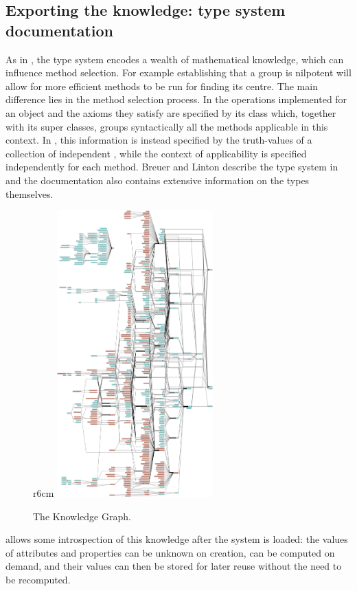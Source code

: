 \subsection{Exporting the \GAP knowledge: type system documentation}
\label{sec:gaptypes}

As in \Sage, the \GAP type system encodes a wealth of mathematical
knowledge, which can influence method selection. For example
establishing that a group is nilpotent will allow for more efficient
methods to be run for finding its centre. The main difference lies in
the method selection process. In \Sage the operations
implemented for an object and the axioms they satisfy are specified by
its class which, together with its super classes, groups syntactically
all the methods applicable in this context. In \GAP, this information
is instead specified by the truth-values of a collection of
independent , while the context of applicability is
specified independently for each method.
%
Breuer and Linton describe the \GAP type system in \cite{breuer-linton} and
the \GAP documentation \cite{GAP4} also contains extensive information on the types
themselves.

\begin{figure}r{6cm}\vspace*{-2em}
  \includegraphics[width=6cm]{gap-graph}\vspace*{-.5em}
  \caption{The \GAP Knowledge Graph.\label{fig:gap-graph}}\vspace*{-2em}
\end{figure}
\GAP allows some introspection of this knowledge after the system is loaded: the values of
attributes and properties can be unknown on creation, can be computed on demand, and their
values can then be stored for later reuse without the need to be recomputed.

